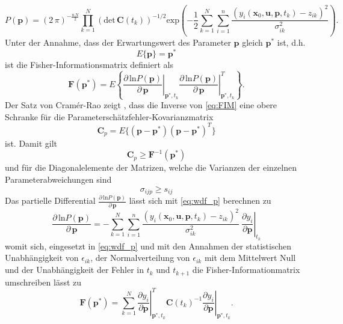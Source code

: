 \begin{equation}\label{eq:wdf_p}
P(\pmb{p}) = (2\, \pi)^{-\frac{n\,N}{2}}\prod^N_{k=1}\left(\mathrm{det}\,\pmb{C}(t_k)\right)^{-1/2}\mathrm{exp}\left(-\frac{1}{2}\sum^N_{k=1}\sum^n_{i=1}\frac{\left(y_i(\pmb{x}_0,\pmb{u},\pmb{p},t_k)-z_{ik}\right)^2}{\sigma^2_{ik}}\right).
\end{equation}
Unter der Annahme, dass der Erwartungswert des Parameter $\pmb{p}$ gleich $\pmb{p}^*$ ist, d.h. 
\begin{equation}
E\lbrace\pmb{p}\rbrace = \pmb{p}^*
\end{equation}
ist die Fisher-Informationsmatrix definiert als
\begin{equation}\label{eq:FIM}
\pmb{F}(\pmb{p}^*)=E\left\lbrace\left. \frac{\partial\,\mathrm{ln}P(\pmb{p})}{\partial\, \pmb{p}}\right|_{\pmb{p}^*,t_k} \left.\frac{\partial\,\mathrm{ln}P(\pmb{p})}{\partial\, \pmb{p}}\right|_{\pmb{p}^*,t_k}^T\right\rbrace.
\end{equation}
Der Satz von Cramér-Rao zeigt \cite{Goodwin.1977}, dass die Inverse von \eqref{eq:FIM} eine obere Schranke für die Parameterschätzfehler-Kovarianzmatrix 
\begin{equation}
\pmb{C}_p = E\lbrace(\pmb{p}-\pmb{p}^*)(\pmb{p}-\pmb{p}^*)^T\rbrace
\end{equation}
ist. Damit gilt
\begin{equation}
\pmb{C}_p \geq \pmb{F}^{-1}(\pmb{p}^*)
\end{equation}
und für die Diagonalelemente der Matrizen, welche die Varianzen der einzelnen Parameterabweichungen sind
\begin{equation}
\sigma_{ijp} \geq s_{ij}
\end{equation}
Das partielle Differential $\frac{\partial\,\mathrm{ln}P(\pmb{p})}{\partial\, \pmb{p}}$ lässt sich mit \eqref{eq:wdf_p} berechnen zu 
\begin{equation}
\frac{\partial\,\mathrm{ln}P(\pmb{p})}{\partial\, \pmb{p}} = -\sum^N_{k=1}\sum^n_{i=1}\frac{\left(y_i(\pmb{x}_0,\pmb{u},\pmb{p},t_k)-z_{ik}\right)^2}{\sigma^2_{ik}}\ \left. \frac{\partial y_i}{\partial \pmb{p}}\right|_{t_k}
\end{equation}
womit sich, eingesetzt in \eqref{eq:wdf_p} und mit den Annahmen der statistischen Unabhängigkeit von $\epsilon_{ik}$, der Normalverteilung von $\epsilon_{ik}$ mit dem Mittelwert Null und der Unabhängigkeit der Fehler in $t_k$ und $t_{k+1}$ die Fisher-Informationmatrix umschreiben lässt zu  
\begin{equation}
\pmb{F}(\pmb{p}^*) = \sum_{k=1}^N \left. \frac{\partial y_i}{\partial \pmb{p}}\right|_{\pmb{p}^*,t_k}^T \pmb{C}(t_k)^{-1} \left.\frac{\partial y_i}{\partial \pmb{p}}\right|_{\pmb{p}^*,t_k}.
\end{equation}
